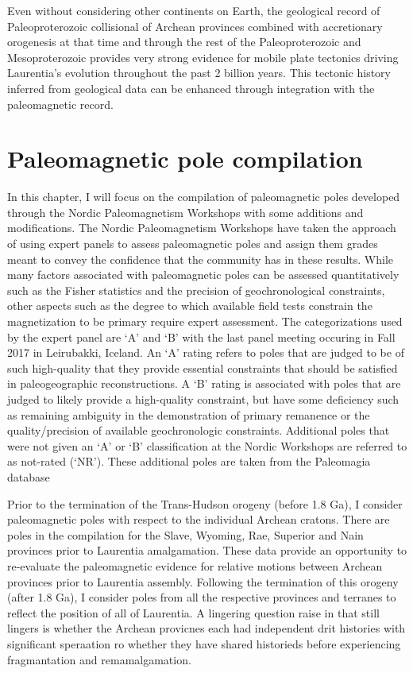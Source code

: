 \documentclass[11pt,letterpaper]{article}
\begin{document}
Even without considering other continents on Earth, the geological record of Paleoproterozoic collisional of Archean provinces combined with accretionary orogenesis at that time and through the rest of the Paleoproterozoic and Mesoproterozoic provides very strong evidence for mobile plate tectonics driving Laurentia's evolution throughout the past 2 billion years. This tectonic history inferred from geological data can be enhanced through integration with the paleomagnetic record.

\section*{Paleomagnetic pole compilation}

In this chapter, I will focus on the compilation of paleomagnetic poles developed through the Nordic Paleomagnetism Workshops with some additions and modifications. The Nordic Paleomagnetism Workshops have taken the approach of using expert panels to assess paleomagnetic poles and assign them grades meant to convey the confidence that the community has in these results. While many factors associated with paleomagnetic poles can be assessed quantitatively such as the Fisher statistics and the precision of geochronological constraints, other aspects such as the degree to which available field tests constrain the magnetization to be primary require expert assessment. The categorizations used by the expert panel are `A' and `B' with the last panel meeting occuring in Fall 2017 in Leirubakki, Iceland. An `A' rating refers to poles that are judged to be of such high-quality that they provide essential constraints that should be satisfied in paleogeographic reconstructions. A `B' rating is associated with poles that are judged to likely provide a high-quality constraint, but have some deficiency such as remaining ambiguity in the demonstration of primary remanence or the quality/precision of available geochronologic constraints. Additional poles that were not given an `A' or `B' classification at the Nordic Workshops are referred to as not-rated (`NR'). These additional poles are taken from the Paleomagia database \citep{Veikkolainen2013a}

Prior to the termination of the Trans-Hudson orogeny (before 1.8 Ga), I consider paleomagnetic poles with respect to the individual Archean cratons. There are poles in the compilation for the Slave, Wyoming, Rae, Superior and Nain provinces prior to Laurentia amalgamation. These data provide an opportunity to re-evaluate the paleomagnetic evidence for relative motions between Archean provinces prior to Laurentia assembly. Following the termination of this orogeny (after 1.8 Ga), I consider poles from all the respective provinces and terranes to reflect the position of all of Laurentia. A lingering question raise in \citet{Hoffman198a} that still lingers is whether the Archean provicnes each had independent drit histories with significant speraation ro whether they have shared historieds before experiencing fragmantation and remamalgamation.
\end{document}
